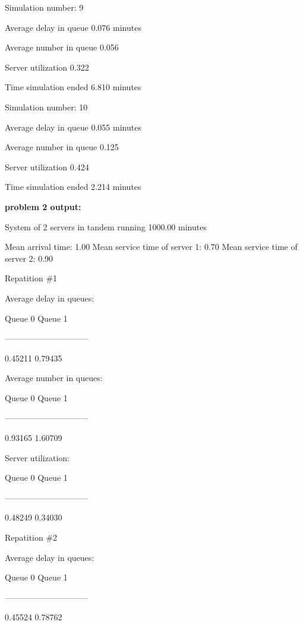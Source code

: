 \documentclass{article}
\begin{document}
Simulation number: 9



Average delay in queue      0.076 minutes

Average number in queue     0.056

Server utilization          0.322

Time simulation ended       6.810 minutes

Simulation number: 10



Average delay in queue      0.055 minutes

Average number in queue     0.125

Server utilization          0.424

Time simulation ended       2.214 minutes


\newpage

\textbf{problem 2 output:}

System of 2 servers in tandem running 1000.00 minutes

Mean arrival time: 1.00
Mean service time of server 1: 0.70
Mean service time of server 2: 0.90


 Repatition \#1



 Average delay in queues:
 
 Queue 0		Queue 1
 
 ------------------------------
 
 0.45211		0.79435
 


 Average number in queues:
 
 Queue 0		Queue 1
 
 ------------------------------
 
 0.93165		1.60709
 


 Server utilization:
 
 Queue 0		Queue 1
 
 ------------------------------
 
0.48249		0.34030		



 Repatition \#2



 Average delay in queues:
 
 Queue 0		Queue 1
 
 ------------------------------
 
 0.45524		0.78762
 
\end{document}
